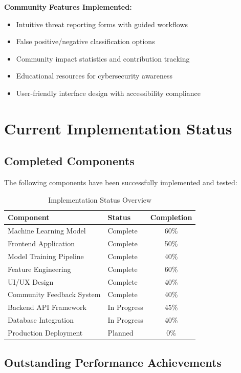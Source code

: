 \textbf{Community Features Implemented:}
\begin{itemize}
	\item Intuitive threat reporting forms with guided workflows
	\item False positive/negative classification options
	\item Community impact statistics and contribution tracking
	\item Educational resources for cybersecurity awareness
	\item User-friendly interface design with accessibility compliance
\end{itemize}

\section{Current Implementation Status}

\subsection{Completed Components}

The following components have been successfully implemented and tested:

\begin{table}[htbp]
	\centering
	\caption{Implementation Status Overview}
	\label{tab:implementation-status}
	\begin{tabular}{llc}
		\toprule
		\textbf{Component} & \textbf{Status} & \textbf{Completion} \\
		\midrule
		Machine Learning Model & Complete & 60\% \\
		Frontend Application & Complete & 50\% \\
		Model Training Pipeline & Complete & 40\% \\
		Feature Engineering & Complete & 60\% \\
		UI/UX Design & Complete & 40\% \\
		Community Feedback System & Complete & 40\% \\
		Backend API Framework & In Progress & 45\% \\
		Database Integration & In Progress & 40\% \\
		Production Deployment & Planned & 0\% \\
		\bottomrule
	\end{tabular}
\end{table}

\subsection{Outstanding Performance Achievements}

